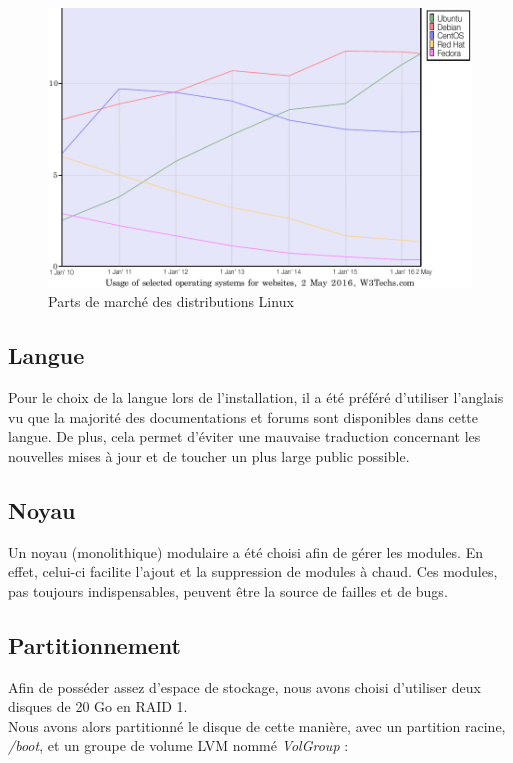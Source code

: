 \begin{figure}[h]
  \centering
  \includegraphics[scale=0.95]
  {textures/images/installation/distributions.pdf}
  \caption{Parts de marché des distributions Linux}
\end{figure}

\newpage


\subsection{Langue}
\label{subsec:langue}

Pour le choix de la langue lors de l'installation, il a été préféré d'utiliser
l'anglais vu que la majorité des documentations et forums sont disponibles dans
cette langue. De plus, cela permet d'éviter une mauvaise traduction concernant
les nouvelles mises à jour et de toucher un plus large public possible.


\subsection{Noyau}
\label{subsec:noyau}

Un noyau (monolithique) modulaire a été choisi afin de gérer les
modules. En effet, celui-ci facilite l'ajout et la suppression de modules à
chaud. Ces modules, pas toujours indispensables, peuvent être la source de
failles et de bugs.


\subsection{Partitionnement}
\label{subsec:partitionnement}

Afin de posséder assez d'espace de stockage, nous avons choisi d'utiliser deux
disques de 20 Go en RAID 1. \\
Nous avons alors partitionné le disque de cette manière, avec un partition racine,
\textit{/boot}, et un groupe de volume LVM nommé \textit{VolGroup} : \\


